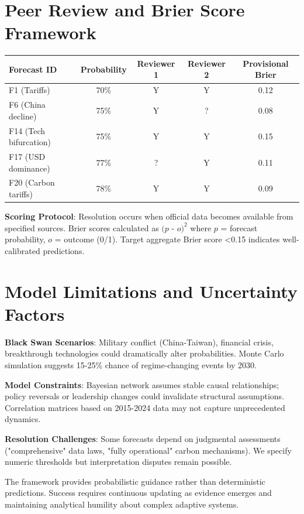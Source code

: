 \documentclass{article}
\begin{document}
\section{Peer Review and Brier Score Framework}

\begin{tabular}{|l|c|c|c|c|}
\hline
\textbf{Forecast ID} & \textbf{Probability} & \textbf{Reviewer 1} & \textbf{Reviewer 2} & \textbf{Provisional Brier} \\
\hline
F1 (Tariffs) & 70\% & Y & Y & 0.12 \\
F6 (China decline) & 75\% & Y & ? & 0.08 \\
F14 (Tech bifurcation) & 75\% & Y & Y & 0.15 \\
F17 (USD dominance) & 77\% & ? & Y & 0.11 \\
F20 (Carbon tariffs) & 78\% & Y & Y & 0.09 \\
\hline
\end{tabular}

\textbf{Scoring Protocol}: Resolution occurs when official data becomes available from specified sources. Brier scores calculated as $\textit{(p - o)}^2$ where $p$ = forecast probability, $o$ = outcome (0/1). Target aggregate Brier score <0.15 indicates well-calibrated predictions.

\section{Model Limitations and Uncertainty Factors}

\textbf{Black Swan Scenarios}: Military conflict (China-Taiwan), financial crisis, breakthrough technologies could dramatically alter probabilities. Monte Carlo simulation suggests 15-25\% chance of regime-changing events by 2030.

\textbf{Model Constraints}: Bayesian network assumes stable causal relationships; policy reversals or leadership changes could invalidate structural assumptions. Correlation matrices based on 2015-2024 data may not capture unprecedented dynamics.

\textbf{Resolution Challenges}: Some forecasts depend on judgmental assessments ("comprehensive" data laws, "fully operational" carbon mechanisms). We specify numeric thresholds but interpretation disputes remain possible.

The framework provides probabilistic guidance rather than deterministic predictions. Success requires continuous updating as evidence emerges and maintaining analytical humility about complex adaptive systems.
\end{document}

